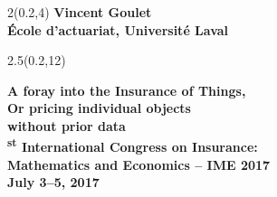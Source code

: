 \begingroup

\textblockorigin{0mm}{0mm}
\begin{frame}[plain]
  \begin{textblock*}{2\TPHorizModule}(0.2\TPHorizModule,4\TPVertModule)
    \fontsize{12}{12}\selectfont
    \bfseries
    Vincent Goulet \\
    \fontsize{10}{11}\selectfont
    \mdseries
    École d'actuariat, Université Laval
  \end{textblock*}

  \begin{textblock*}{2.5\TPHorizModule}(0.2\TPHorizModule,12\TPVertModule)
    \raggedright%
    \bfseries
    \fontsize{20}{20}\selectfont
    A foray into the Insurance of Things, \\
    Or pricing individual objects \\
    without prior data \\
    \mdseries
    \fontsize{12}{13}\textsuperscript{st} International Congress on
    Insurance: \\ Mathematics and Economics -- IME 2017 \\
    July 3--5, 2017
  \end{textblock*}
\end{frame}
\endgroup

